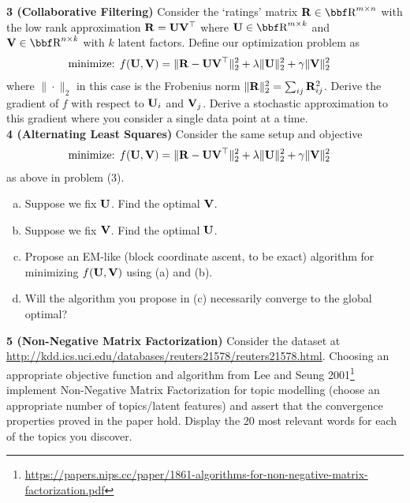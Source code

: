 \documentclass[12pt,letterpaper,fleqn]{hmcpset}
\begin{document}
\textbf{3 (Collaborative Filtering)} Consider the `ratings' matrix $\Rb\in\RR^{m\times n}$
with the low rank approximation ${\bf R} = {\bf U} {\bf V}^\top$ where $\Ub\in\RR^{m\times k}$ and $\Vb\in\RR^{n\times k}$
with $k$ latent factors. Define our optimization problem as
\begin{align*}
    \text{minimize: } & f({\bf U},{\bf V}) = \|{\bf R} - {\bf U}{\bf V}^\top\|_2^2 + \lambda\|{\bf U}\|_2^2 + \gamma\|{\bf V}\|_2^2
\end{align*}
where $\|\cdot\|_2$ in this case is the Frobenius norm $\|{\bf R}\|_2^2 = \sum_{ij}{\bf R}_{ij}^2$.
Derive the gradient of $f$ with respect to ${\bf U}_i$ and ${\bf V}_j$. Derive a stochastic
approximation to this gradient where you consider a single data point at a time.\\

\textbf{4 (Alternating Least Squares)} Consider the same setup and objective
\begin{align*}
    \text{minimize: } & f({\bf U},{\bf V}) = \|{\bf R} - {\bf U}{\bf V}^\top\|_2^2 + \lambda\|{\bf U}\|_2^2 + \gamma\|{\bf V}\|_2^2
\end{align*}
as above in problem (3).
\begin{enumerate}[(a)]
    \item Suppose we fix ${\bf U}$. Find the optimal ${\bf V}$.
    \item Suppose we fix ${\bf V}$. Find the optimal ${\bf U}$.
    \item Propose an EM-like (block coordinate ascent, to be exact) algorithm
        for minimizing $f({\bf U},{\bf V})$ using (a) and (b).
    \item Will the algorithm you propose in (c) necessarily converge to the global
        optimal?
\end{enumerate}

\textbf{5 (Non-Negative Matrix Factorization)} Consider the dataset at
\url{http://kdd.ics.uci.edu/databases/reuters21578/reuters21578.html}. Choosing an appropriate
objective function and algorithm from Lee and Seung 2001\footnote{\url{https://papers.nips.cc/paper/1861-algorithms-for-non-negative-matrix-factorization.pdf}}
implement Non-Negative Matrix Factorization for topic modelling (choose an appropriate number
of topics/latent features) and assert that the convergence properties proved in the paper hold. 
Display the 20 most relevant words for each of the topics you discover.
\end{document}
